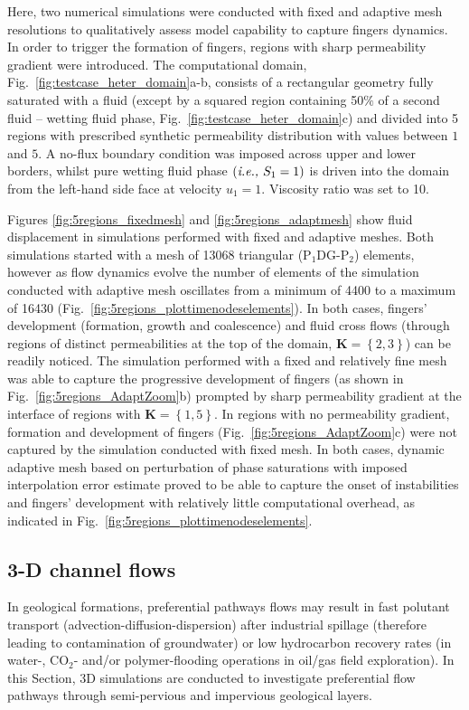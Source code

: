 \documentclass[preprint,authoryear,12pt]{elsarticle}
\newcommand{\PN}[2][error]{P$_{#1}$DG-P$_{#2}$}
\newcommand{\ie}{{\it i.e., }}
\begin{document}
\medskip
Here, two numerical simulations were conducted with fixed and adaptive mesh resolutions to qualitatively assess model capability to capture fingers dynamics. In order to trigger the formation of fingers, regions with sharp permeability gradient were introduced. The computational domain, Fig.~\ref{fig:testcase_heter_domain}a-b, consists of a rectangular geometry fully saturated with a fluid (except by a squared region containing 50$\%$ of a second fluid -- wetting fluid phase, Fig.~\ref{fig:testcase_heter_domain}c) and divided into 5 regions with prescribed synthetic permeability distribution with values between $1$ and $5$. A no-flux boundary condition was imposed across upper and lower borders, whilst pure wetting fluid phase $\left(\text{\ie} S_{1}=1\right)$ is driven into the domain from the left-hand side face at velocity $u_{1}=1$. Viscosity ratio was set to 10.

\medskip
Figures \ref{fig:5regions_fixedmesh} and \ref{fig:5regions_adaptmesh} show fluid displacement in simulations performed with fixed and adaptive meshes. Both simulations started with a mesh of 13068 triangular (\PN[1]{2}) elements, however as flow dynamics evolve the number of elements of the simulation conducted with adaptive mesh oscillates from a minimum of 4400 to a maximum of 16430 (Fig.~\ref{fig:5regions_plottimenodeselements}). In both cases, fingers' development (formation, growth and coalescence) and fluid cross flows (through regions of distinct permeabilities at the top of the domain, $\mathbf{K}=\left\{2,3\right\}$) can be readily noticed. The simulation performed with a fixed and relatively fine mesh was able to capture the progressive development of fingers (as shown in Fig.~\ref{fig:5regions_AdaptZoom}b) prompted by sharp permeability gradient at the interface of regions with $\mathbf{K}=\left\{1,5\right\}$. In regions with no permeability gradient, formation and development of fingers (Fig.~\ref{fig:5regions_AdaptZoom}c) were not captured by the simulation conducted with fixed mesh. In both cases, dynamic adaptive mesh based on perturbation of phase saturations with imposed interpolation error estimate proved to be able to capture the onset of instabilities and fingers' development with relatively little computational overhead, as indicated in Fig.~\ref{fig:5regions_plottimenodeselements}.   

\subsection{3-D channel flows} \label{section:results_3D} 
In geological formations, preferential pathways flows may result in fast polutant transport (advection-diffusion-dispersion) after industrial spillage (therefore leading to contamination of groundwater) or low hydrocarbon recovery rates (in water-, CO$_{2}$- and/or polymer-flooding operations in oil/gas field exploration). In this Section, 3D simulations are conducted to investigate preferential flow pathways through semi-pervious and impervious geological layers. 
\end{document}
